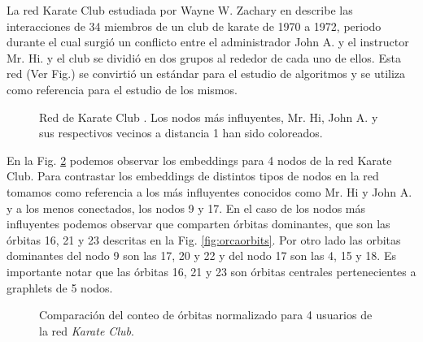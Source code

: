 La red Karate Club estudiada por Wayne W. Zachary en  \cite{zachary_information_1977} describe las interacciones de 34 miembros de un club de karate de 1970 a 1972, periodo durante el cual surgió un conflicto entre el administrador John A. y el instructor Mr. Hi. y el club se dividió en dos grupos al rededor de cada uno de ellos. Esta red (Ver Fig.\label{fig:karateclub}) se convirtió un estándar para el estudio de algoritmos y se utiliza como referencia para el estudio de los mismos.

 \begin{figure}[htbp]
  \centering
  
    \caption{Red de Karate Club \cite{zachary_information_1977}. Los nodos más influyentes, Mr. Hi, John A. y sus respectivos vecinos a distancia 1 han sido coloreados.}
    \label{fig:karateclub}
\end{figure}

En la Fig. \ref{fig:karateorbits} podemos observar los embeddings para 4 nodos de la red Karate Club. Para contrastar los embeddings de distintos tipos de nodos en la red tomamos como referencia a los más influyentes conocidos como Mr. Hi y John A. y a los menos conectados, los nodos 9 y 17. En el caso de los nodos más influyentes podemos observar que comparten órbitas dominantes, que son las órbitas 16, 21 y 23 descritas en la Fig. \ref{fig:orcaorbits}. Por otro lado las orbitas dominantes del nodo 9 son las 17, 20 y 22 y del nodo 17 son las 4, 15 y 18. Es importante notar que las órbitas 16, 21 y 23 son órbitas centrales pertenecientes a graphlets de 5 nodos.

 \begin{figure}[htbp]
   \centering
   
    \caption{Comparación del conteo de órbitas normalizado para 4 usuarios de la red \textit{Karate Club}.}
    \label{fig:karateorbits}
\end{figure}